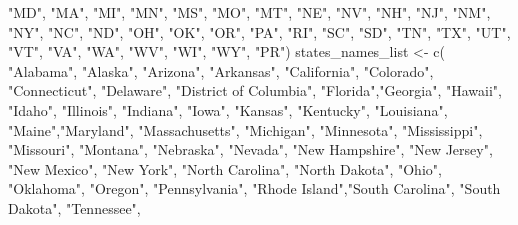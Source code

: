 \documentclass[
  11 pt,
  openany]{book}
\newenvironment{Shaded}{\begin{snugshade}}{\end{snugshade}}
\newcommand{\FunctionTok}[1]{\textcolor[rgb]{0.00,0.00,0.00}{#1}}
\newcommand{\NormalTok}[1]{#1}
\newcommand{\OtherTok}[1]{\textcolor[rgb]{0.56,0.35,0.01}{#1}}
\newcommand{\StringTok}[1]{\textcolor[rgb]{0.31,0.60,0.02}{#1}}
\begin{document}
\begin{Shaded}
\begin{Highlighting}[]
  \StringTok{"MD"}\NormalTok{, }\StringTok{"MA"}\NormalTok{, }\StringTok{"MI"}\NormalTok{, }\StringTok{"MN"}\NormalTok{, }\StringTok{"MS"}\NormalTok{, }\StringTok{"MO"}\NormalTok{, }\StringTok{"MT"}\NormalTok{, }\StringTok{"NE"}\NormalTok{, }\StringTok{"NV"}\NormalTok{, }\StringTok{"NH"}\NormalTok{,}
  \StringTok{"NJ"}\NormalTok{, }\StringTok{"NM"}\NormalTok{, }\StringTok{"NY"}\NormalTok{, }\StringTok{"NC"}\NormalTok{, }\StringTok{"ND"}\NormalTok{, }\StringTok{"OH"}\NormalTok{, }\StringTok{"OK"}\NormalTok{, }\StringTok{"OR"}\NormalTok{, }\StringTok{"PA"}\NormalTok{, }\StringTok{"RI"}\NormalTok{,}
  \StringTok{"SC"}\NormalTok{, }\StringTok{"SD"}\NormalTok{, }\StringTok{"TN"}\NormalTok{, }\StringTok{"TX"}\NormalTok{, }\StringTok{"UT"}\NormalTok{, }\StringTok{"VT"}\NormalTok{, }\StringTok{"VA"}\NormalTok{, }\StringTok{"WA"}\NormalTok{, }\StringTok{"WV"}\NormalTok{, }\StringTok{"WI"}\NormalTok{,}
  \StringTok{"WY"}\NormalTok{, }\StringTok{"PR"}\NormalTok{)}
\NormalTok{states\_names\_list }\OtherTok{\textless{}{-}} \FunctionTok{c}\NormalTok{(}
  \StringTok{"Alabama"}\NormalTok{, }\StringTok{"Alaska"}\NormalTok{, }\StringTok{"Arizona"}\NormalTok{, }\StringTok{"Arkansas"}\NormalTok{, }\StringTok{"California"}\NormalTok{, }
  \StringTok{"Colorado"}\NormalTok{, }\StringTok{"Connecticut"}\NormalTok{, }\StringTok{"Delaware"}\NormalTok{, }
  \StringTok{"District of Columbia"}\NormalTok{, }\StringTok{"Florida"}\NormalTok{,}\StringTok{"Georgia"}\NormalTok{, }\StringTok{"Hawaii"}\NormalTok{, }
  \StringTok{"Idaho"}\NormalTok{, }\StringTok{"Illinois"}\NormalTok{, }\StringTok{"Indiana"}\NormalTok{, }\StringTok{"Iowa"}\NormalTok{, }\StringTok{"Kansas"}\NormalTok{, }
  \StringTok{"Kentucky"}\NormalTok{, }\StringTok{"Louisiana"}\NormalTok{, }\StringTok{"Maine"}\NormalTok{,}\StringTok{"Maryland"}\NormalTok{, }
  \StringTok{"Massachusetts"}\NormalTok{, }\StringTok{"Michigan"}\NormalTok{, }\StringTok{"Minnesota"}\NormalTok{, }\StringTok{"Mississippi"}\NormalTok{, }
  \StringTok{"Missouri"}\NormalTok{, }\StringTok{"Montana"}\NormalTok{, }\StringTok{"Nebraska"}\NormalTok{, }\StringTok{"Nevada"}\NormalTok{, }\StringTok{"New Hampshire"}\NormalTok{,}
  \StringTok{"New Jersey"}\NormalTok{, }\StringTok{"New Mexico"}\NormalTok{, }\StringTok{"New York"}\NormalTok{, }\StringTok{"North Carolina"}\NormalTok{, }
  \StringTok{"North Dakota"}\NormalTok{, }\StringTok{"Ohio"}\NormalTok{, }\StringTok{"Oklahoma"}\NormalTok{, }\StringTok{"Oregon"}\NormalTok{, }\StringTok{"Pennsylvania"}\NormalTok{, }
  \StringTok{"Rhode Island"}\NormalTok{,}\StringTok{"South Carolina"}\NormalTok{, }\StringTok{"South Dakota"}\NormalTok{, }\StringTok{"Tennessee"}\NormalTok{, }

\end{Highlighting}
\end{Shaded}
\end{document}
